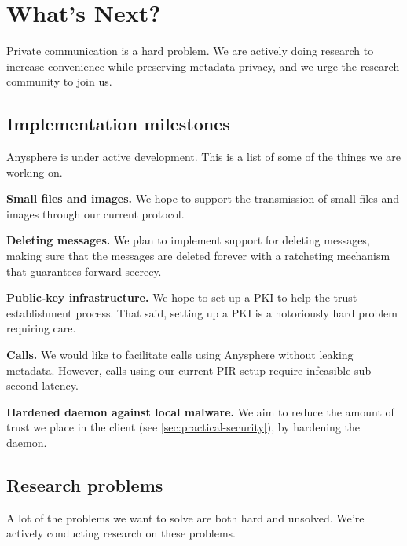 \section{What's Next?}
\label{sec:future}

Private communication is a hard problem. We are actively doing research to increase convenience while preserving metadata privacy, and we urge the research community to join us.


\subsection{Implementation milestones}
Anysphere is under active development. This is a list of some of the things we are working on.

\textbf{Small files and images.} We hope to support the transmission of small files and images through our current protocol.

\textbf{Deleting messages.} We plan to implement support for deleting messages, making sure that the messages are deleted forever with a ratcheting mechanism that guarantees forward secrecy.

\textbf{Public-key infrastructure.} We hope to set up a PKI to help the trust establishment process. That said, setting up a PKI is a notoriously hard problem requiring care.

\textbf{Calls.} We would like to facilitate calls using Anysphere without leaking metadata. However, calls using our current PIR setup require infeasible sub-second latency.

\textbf{Hardened daemon against local malware.} We aim to reduce the amount of trust we place in the client (see \cref{sec:practical-security}), by hardening the daemon.

\subsection{Research problems} 
A lot of the problems we want to solve are both hard and unsolved. We're actively conducting research on these problems.

